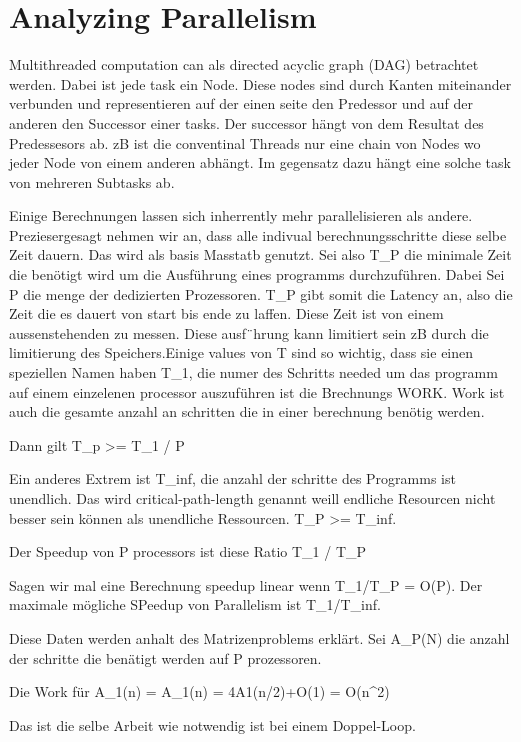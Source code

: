 \section{Analyzing Parallelism}

Multithreaded computation can als directed acyclic graph (DAG) betrachtet werden. Dabei ist jede task ein Node. Diese nodes sind durch Kanten miteinander verbunden und representieren auf der einen seite den Predessor und auf der anderen den Successor einer tasks. Der successor hängt von dem Resultat des Predessesors ab. zB ist die conventinal Threads nur eine chain von Nodes wo jeder Node von einem anderen abhängt. Im gegensatz dazu hängt eine solche task von mehreren Subtasks ab.

Einige Berechnungen lassen sich inherrently mehr parallelisieren als andere. Preziesergesagt nehmen wir an, dass alle indivual berechnungsschritte diese selbe Zeit dauern. Das wird als basis Masstatb genutzt. Sei also T_P die minimale Zeit die benötigt wird um die Ausführung eines programms durchzuführen. Dabei Sei P die menge der dedizierten Prozessoren. T_P gibt somit die Latency an, also die Zeit die es dauert von start bis ende zu laffen. Diese Zeit ist von einem aussenstehenden zu messen. Diese ausf¨hrung kann limitiert sein zB durch die limitierung des Speichers.Einige values von T sind so wichtig, dass sie einen speziellen Namen haben T_1, die numer des Schritts needed um das programm auf einem einzelenen processor auszuführen ist die Brechnungs WORK. Work ist auch die gesamte anzahl an schritten die in einer berechnung benötig werden. 

Dann gilt T_p >= T_1 / P

Ein anderes Extrem ist T_inf, die anzahl der schritte des Programms ist unendlich. Das wird critical-path-length genannt weill endliche Resourcen nicht besser sein können als unendliche Ressourcen. T_P >= T_inf.


Der Speedup von P processors ist diese Ratio T_1 / T_P


Sagen wir mal eine Berechnung speedup linear wenn T_1/T_P = O(P). Der maximale mögliche SPeedup von Parallelism ist T_1/T_inf. 

Diese Daten werden anhalt des Matrizenproblems erklärt. Sei A_P(N) die anzahl der schritte die benätigt werden auf P prozessoren. 


Die Work für A_1(n) = A_1(n) = 4A1(n/2)+O(1) = O(n^2)

Das ist die selbe Arbeit wie notwendig ist bei einem Doppel-Loop.


